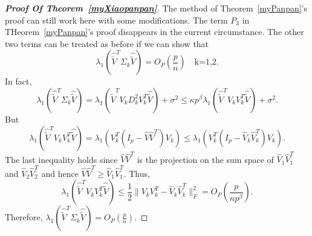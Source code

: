\begin{proof}[\textbf{Proof Of Theorem~\ref{myXiaopanpan}}]
    The method of Theorem~\ref{myPanpan}'s proof can still work here with some modifications.
    The term $P_3$ in THeorem~\ref{myPanpan}'s proof disappears in the current circumstance.
    The other two terms can be treated as before if we can show that
    $$
    \lambda_1(\hat{\tilde{V}}^T \Sigma_k \hat{\tilde{V}}) =O_P(\frac{p}{n})\quad \textrm{k=1,2.}
    $$
    In fact,
    $$
    \lambda_1(\hat{\tilde{V}}^T \Sigma_k \hat{\tilde{V}})
    =
    \lambda_1(\hat{\tilde{V}}^T V_k D^2_k V_k^T \hat{\tilde{V}}) + \sigma^2
    \leq
    \kappa p^{\beta}\lambda_1(\hat{\tilde{V}}^T V_k V_k^T \hat{\tilde{V}}) +\sigma^2.
    $$
    But
    $$
    \lambda_1(\hat{\tilde{V}}^T V_k V_k^T \hat{\tilde{V}})
    =
    \lambda_1( V_k^T(I_p- \hat{V}\hat{V}^T) V_k)
    \leq
    \lambda_1( V_k^T(I_p- \hat{V}_k\hat{V}_k^T) V_k).
    $$
    The last inequality holds since $\hat{V}\hat{V}^T$ is the projection on the sum space of $\hat{V}_1\hat{V}_1^T$ and $\hat{V}_2\hat{V}_2^T$ and hence $\hat{V}\hat{V}^T\geq \hat{V}_1\hat{V}_1^T$.
    Thus,
    $$
    \lambda_1(\hat{\tilde{V}}^T V_k V_k^T \hat{\tilde{V}})
    \leq \frac{1}{2}\|V_k V_k^T - \hat{V}_k\hat{V}_k^T\|^2_F=O_P(\frac{p}{np^{\beta}}).
    $$
    Therefore,
    $
    \lambda_1(\hat{\tilde{V}}^T \Sigma_k \hat{\tilde{V}})
    =O_P(\frac{p}{n})$.
\end{proof}

